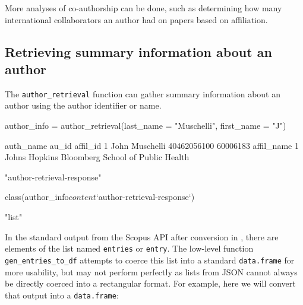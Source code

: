 More analyses of co-authorship can be done, such as determining how many
international collaborators an author had on papers based on
affiliation.

\hypertarget{retrieving-summary-information-about-an-author}{%
\subsection{Retrieving summary information about an
author}\label{retrieving-summary-information-about-an-author}}

The \texttt{author\_retrieval} function can gather summary information
about an author using the author identifier or name.

\begin{Schunk}
\begin{Sinput}
author_info = author_retrieval(last_name = "Muschelli", first_name = "J")
\end{Sinput}
\begin{Soutput}
       auth_name       au_id affil_id
1 John Muschelli 40462056100 60006183
                                       affil_name
1 Johns Hopkins Bloomberg School of Public Health
\end{Soutput}
\begin{Soutput}
[1] "author-retrieval-response"
\end{Soutput}
\begin{Sinput}
class(author_info$content$`author-retrieval-response`)
\end{Sinput}
\begin{Soutput}
[1] "list"
\end{Soutput}
\end{Schunk}

In the standard output from the Scopus API after conversion in
, there are elements of the list named \texttt{entries} or
\texttt{entry}. The low-level function \texttt{gen\_entries\_to\_df}
attempts to coerce this list into a standard \texttt{data.frame} for
more usability, but may not perform perfectly as lists from JSON cannot
always be directly coerced into a rectangular format. For example, here
we will convert that output into a \texttt{data.frame}:

